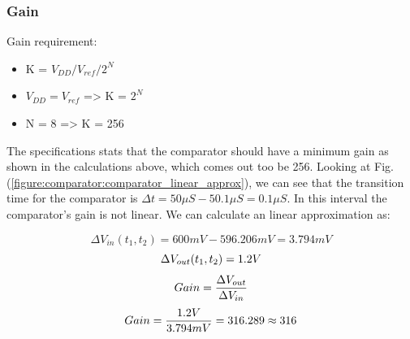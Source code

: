 \documentclass[english, 12pt, a4paper]{ifimaster}
\begin{document}
\subsubsection{Gain}

Gain requirement:
\begin{itemize}
\item K = \(V_{DD}/V_{ref}/2^N\)
\item \(V_{DD} = V_{ref}\) => K = \(2^N\)
\item N = 8 => K = 256 

\end{itemize}

\noindent
The specifications stats that the comparator should have a minimum gain as shown in the calculations above, which comes out too be 256.
Looking at Fig. (\ref{figure:comparator:comparator_linear_approx}), we can see that the transition time for the comparator is \(\Delta t = 50\mu S - 50.1\mu S = 0.1\mu S \).
In this interval the comparator's gain is not linear. We can calculate an linear approximation as:

\begin{equation}
 \Delta V_{in}(t_1, t_2) = 600mV - 596.206mV = 3.794mV 
 \end{equation}
 \begin{equation}
 \Delta V_{out}(t_1, t_2) = 1.2V \\
 \end{equation}
 \begin{equation}
 Gain = \frac{\Delta V_{out}}{\Delta V_{in}}\\
 \end{equation}
 \begin{equation}
 Gain = \frac{1.2V}{3.794mV} = 316.289 \approx 316 \\
\end{equation}
\end{document}
